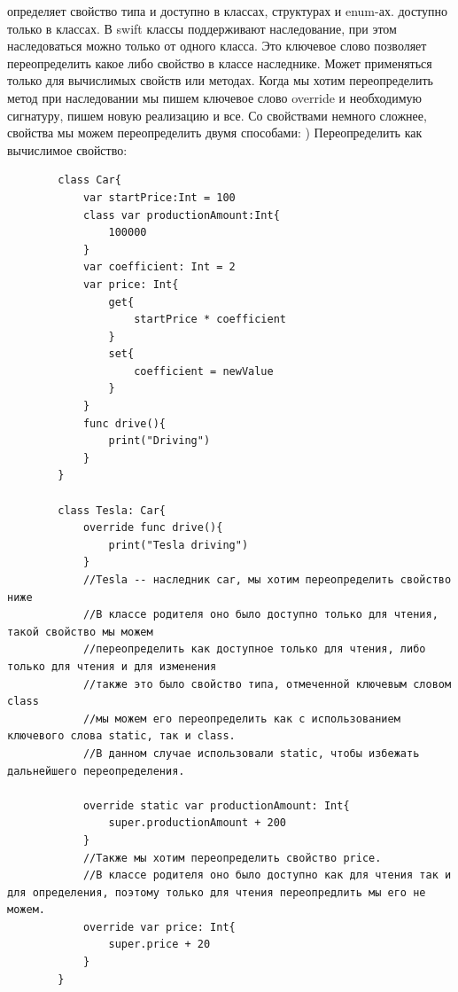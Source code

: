 \documentclass{article}
\begin{document}
    \newline
     определяет свойство типа и доступно в классах, структурах и enum-ах. 
    \newline
     доступно только в классах. В swift классы поддерживают наследование, при этом наследоваться можно только от одного класса. Это ключевое слово позволяет переопределить какое либо свойство в классе наследнике. Может применяться только для вычислимых свойств или методах.
    \newline
    Когда мы хотим переопределить метод при наследовании мы пишем ключевое слово override и необходимую сигнатуру, пишем новую реализацию и все. 
    \newline
    Со свойствами немного сложнее, свойства мы можем переопределить двумя способами: 
    ) Переопределить как вычислимое свойство: 
    \begin{verbatim}
        class Car{
            var startPrice:Int = 100
            class var productionAmount:Int{
                100000
            }
            var coefficient: Int = 2
            var price: Int{
                get{
                    startPrice * coefficient
                }
                set{
                    coefficient = newValue
                }
            }
            func drive(){
                print("Driving")
            }
        }

        class Tesla: Car{
            override func drive(){
                print("Tesla driving")
            }
            //Tesla -- наследник car, мы хотим переопределить свойство ниже
            //В классе родителя оно было доступно только для чтения, такой свойство мы можем 
            //переопределить как доступное только для чтения, либо только для чтения и для изменения
            //также это было свойство типа, отмеченной ключевым словом class
            //мы можем его переопределить как с использованием ключевого слова static, так и class.
            //В данном случае использовали static, чтобы избежать дальнейшего переопределения. 
            
            override static var productionAmount: Int{
                super.productionAmount + 200
            }
            //Также мы хотим переопределить свойство price.
            //В классе родителя оно было доступно как для чтения так и для определения, поэтому только для чтения переопредлить мы его не можем. 
            override var price: Int{
                super.price + 20
            }
        }
    \end{verbatim}  
\end{document}
